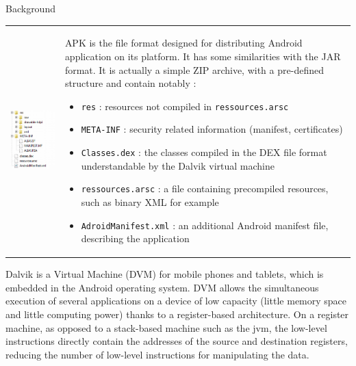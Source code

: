 \begin{chaptercover}{Background}
\begin{indentbox}{1cm}
\begin{tabular}{C{.3\linewidth}m{.66\linewidth}}
  \includegraphics[width=.35\textwidth]{figures/apk-file-structure}
   &
  APK is the file format designed for distributing Android application on its platform. It has some similarities with the JAR format. It is actually a simple ZIP archive, with a pre-defined structure and contain notably :
  \begin{itemize}
    \item \texttt{res} :  resources not compiled in \texttt{ressources.arsc}
    \item \texttt{META-INF} : security related information (manifest, certificates)
    \item \texttt{Classes.dex} : the classes compiled in the DEX file format understandable by the Dalvik virtual machine
    \item \texttt{ressources.arsc} : a file containing precompiled resources, such as binary XML for example
    \item \texttt{AdroidManifest.xml} : an additional Android manifest file, describing the application
  \end{itemize}
  \\
\end{tabular}

Dalvik \cite{course-embedded-device} is a Virtual Machine (DVM) for mobile phones and tablets, which is embedded in the Android operating system. DVM allows the simultaneous execution of several applications on a device of low capacity (little memory space and little computing power) thanks to a register-based architecture. On a register machine, as opposed to a stack-based machine such as the \acrshort{jvm}, the low-level instructions directly contain the addresses of the source and destination registers, reducing the number of low-level instructions for manipulating the data.


\end{indentbox}
\end{chaptercover}
